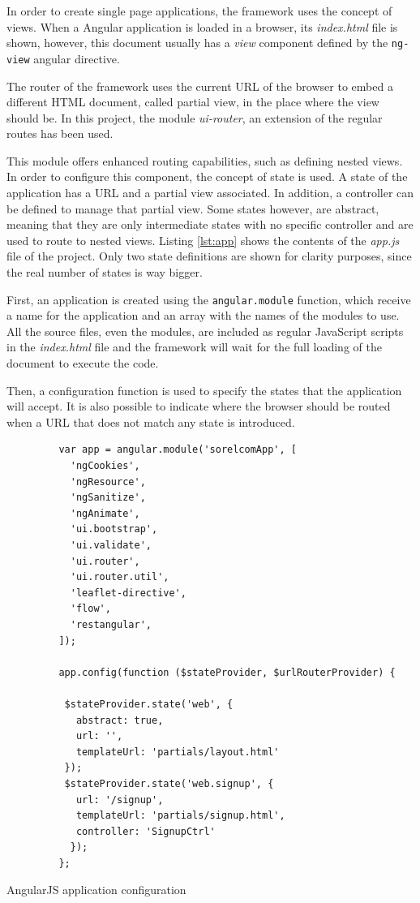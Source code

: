 In order to create single page applications, the framework uses the concept of views. When a Angular application is loaded in a browser, its \textit{index.html} file is shown, however, this document usually has a \textit{view} component defined by the \texttt{ng-view} angular directive.

The router of the framework uses the current URL of the browser to embed a different HTML document, called partial view, in the place where the view should be. In this project, the module \textit{ui-router}, an extension of the regular routes has been used.

This module offers enhanced routing capabilities, such as defining nested views. In order to configure this component, the concept of state is used. A state of the application has a URL and a partial view associated. In addition, a controller can be defined to manage that partial view. Some states however, are abstract, meaning that they are only intermediate states with no specific controller and are used to route to nested views. Listing \ref{lst:app} shows the contents of the \textit{app.js} file of the project. Only two state definitions are shown for clarity purposes, since the real number of states is way bigger. 

First, an application is created using the \texttt{angular.module} function, which receive a name for the application and an array with the names of the modules to use. All the source files, even the modules, are included as regular JavaScript scripts in the \textit{index.html} file and the framework will wait for the full loading of the document to execute the code.

Then, a configuration function is used to specify the states that the application will accept. It is also possible to indicate where the browser should be routed when a URL that does not match any state is introduced.

\begin{listing}[ht]\centering
  \begin{minipage}{.85\textwidth}
    \begin{verbatim}
         var app = angular.module('sorelcomApp', [
           'ngCookies',
           'ngResource',
           'ngSanitize',
           'ngAnimate',
           'ui.bootstrap',
           'ui.validate',
           'ui.router',
           'ui.router.util',
           'leaflet-directive',
           'flow',
           'restangular',
         ]);
          
         app.config(function ($stateProvider, $urlRouterProvider) {
          
          $stateProvider.state('web', {
            abstract: true,
            url: '',
            templateUrl: 'partials/layout.html'
          });
          $stateProvider.state('web.signup', {
            url: '/signup',
            templateUrl: 'partials/signup.html',
            controller: 'SignupCtrl'
           });
         };
    \end{verbatim}
  \end{minipage}
  \caption{AngularJS application configuration}\label{lst:app}
\end{listing}

